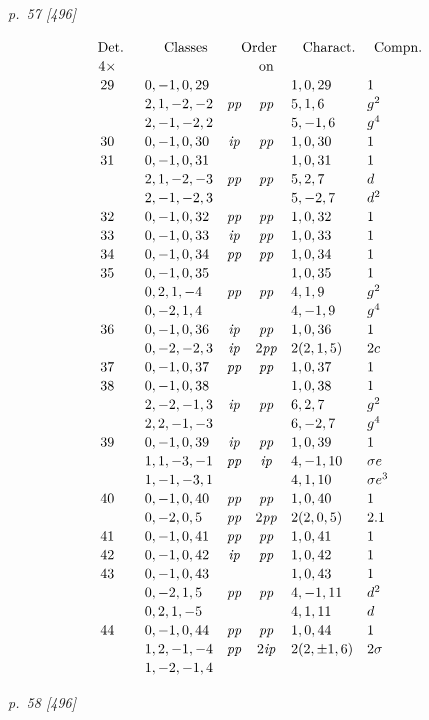 ﻿\documentclass[11pt,a4paper]{article}
\theoremstyle{plain}
\theoremstyle{definition}
\newcommand{\pp}{\mathit{pp}}
\newcommand{\ip}{\mathit{ip}}
\newcommand{\sg}{\sigma}
\newcommand{\row}[7]{#1 & #2 & #3 & #4 & #5 & #6 & #7\\}
\begin{document}
\textit{p.~57 [496]}

\[
\renewcommand{\arraystretch}{1.12}
\begin{array}{c@{\quad}r@{\quad}l@{\quad}c@{\quad}c@{\quad}l@{\quad}l}
\multicolumn{1}{c}{\text{Det.}}&&
\multicolumn{1}{c}{\text{Classes}}&
\multicolumn{2}{c}{\text{Order}}&
\multicolumn{1}{c}{\text{Charact.}}&
\multicolumn{1}{c}{\text{Compn.}}\\
4\times&&& &\text{on}&&\\
\row{29}{}{0,-1,0,29}{}{}{1,0,29}{1}
\row{}{ }{2,1,-2,-2}{\pp}{\pp}{5,1,6}{g^2}
\row{}{ }{2,-1,-2,2}{}{}{5,-1,6}{g^4}
\row{30}{}{0,-1,0,30}{\ip}{\pp}{1,0,30}{1}
\row{31}{}{0,-1,0,31}{}{}{1,0,31}{1}
\row{}{}{2,1,-2,-3}{\pp}{\pp}{5,2,7}{d}
\row{}{}{2,-1,-2,3}{}{}{5,-2,7}{d^2}
\row{32}{}{0,-1,0,32}{\pp}{\pp}{1,0,32}{1}
\row{33}{}{0,-1,0,33}{\ip}{\pp}{1,0,33}{1}
\row{34}{}{0,-1,0,34}{\pp}{\pp}{1,0,34}{1}
\row{35}{}{0,-1,0,35}{}{}{1,0,35}{1}
\row{}{}{0,2,1,-4}{\pp}{\pp}{4,1,9}{g^2}
\row{}{}{0,-2,1,4}{}{}{4,-1,9}{g^4}
\row{36}{}{0,-1,0,36}{\ip}{\pp}{1,0,36}{1}
\row{}{}{0,-2,-2,3}{\ip}{2\pp}{2(2,1,5)}{2c}
\row{37}{}{0,-1,0,37}{\pp}{\pp}{1,0,37}{1}
\row{38}{}{0,-1,0,38}{}{}{1,0,38}{1}
\row{}{}{2,-2,-1,3}{\ip}{\pp}{6,2,7}{g^2}
\row{}{}{2,2,-1,-3}{}{}{6,-2,7}{g^4}
\row{39}{}{0,-1,0,39}{\ip}{\pp}{1,0,39}{1}
\row{}{}{1,1,-3,-1}{\pp}{\ip}{4,-1,10}{\sg e}
\row{}{}{1,-1,-3,1}{}{}{4,1,10}{\sg e^3}
\row{40}{}{0,-1,0,40}{\pp}{\pp}{1,0,40}{1}
\row{}{}{0,-2,0,5}{\pp}{2\pp}{2(2,0,5)}{2.1}
\row{41}{}{0,-1,0,41}{\pp}{\pp}{1,0,41}{1}
\row{42}{}{0,-1,0,42}{\ip}{\pp}{1,0,42}{1}
\row{43}{}{0,-1,0,43}{}{}{1,0,43}{1}
\row{}{}{0,-2,1,5}{\pp}{\pp}{4,-1,11}{d^2}
\row{}{}{0,2,1,-5}{}{}{4,1,11}{d}
\row{44}{}{0,-1,0,44}{\pp}{\pp}{1,0,44}{1}
\row{}{}{1,2,-1,-4}{\pp}{2\ip}{2(2,\pm1,6)}{2\sg}
\row{}{}{1,-2,-1,4}{}{}{}{}
\end{array}
\]

\clearpage
\textit{p.~58 [496]}
\end{document}
